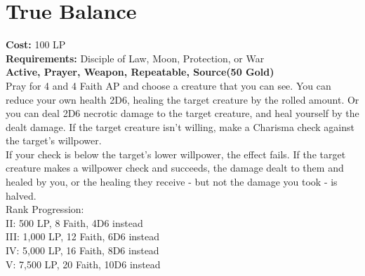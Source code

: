 \section{True Balance}\label{prayer:trueBalance}
\textbf{Cost:} 100 LP\\
\textbf{Requirements:} Disciple of Law, Moon, Protection, or War \\
\textbf{Active, Prayer, Weapon, Repeatable, Source(50 Gold)}\\
Pray for 4 and 4 Faith AP and choose a creature that you can see.
You can reduce your own health 2D6, healing the target creature by the rolled amount.
Or you can deal 2D6 necrotic damage to the target creature, and heal yourself by the dealt damage.
If the target creature isn't willing, make a Charisma check against the target's willpower.\\
If your check is below the target's lower willpower, the effect fails.
If the target creature makes a willpower check and succeeds, the damage dealt to them and healed by you, or the healing they receive - but not the damage you took - is halved.
\\
Rank Progression:\\
II: 500 LP, 8 Faith, 4D6 instead\\
III: 1,000 LP, 12 Faith, 6D6 instead\\
IV: 5,000 LP, 16 Faith, 8D6 instead\\
V: 7,500 LP, 20 Faith, 10D6 instead\\